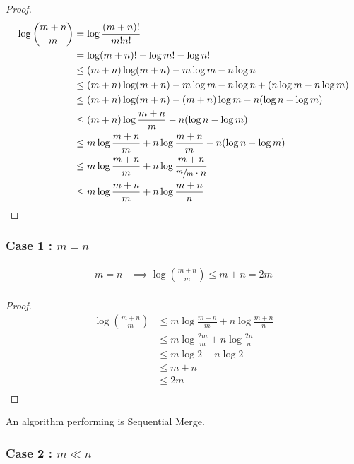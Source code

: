 \begin{proof}
\begin{align*}
\log\binom{m+n}{m} &= \log\frac{(m+n)!}{m!n!}\\
&= \log(m+n)! - \log m! - \log n!\\
&\leq (m+n) \log(m+n) - m \log m - n \log n\\
&\leq (m+n) \log(m+n) - m \log m - n \log n + (n \log m - n \log m)\\
&\leq (m+n) \log(m+n) - (m+n) \log m - n (\log n - \log m)\\
&\leq (m+n) \log\frac{m+n}{m} - n (\log n - \log m)\\
&\leq m \log\frac{m+n}{m} + n \log\frac{m+n}{m} - n (\log n - \log m)\\
&\leq m \log\frac{m+n}{m} + n \log\frac{m+n}{\sfrac{m}{m} \cdot n}\\
&\leq m \log\frac{m+n}{m} + n \log\frac{m+n}{n}\\
\end{align*}
\end{proof}

\subsubsection{Case 1\texorpdfstring{ : $m = n$}{}}

\begin{lemma}
\begin{align*}
m = n &\implies \log\binom{m+n}{m} \leq m + n = 2m\\
\end{align*}
\end{lemma}

\begin{proof}
\begin{align*}
\log\binom{m+n}{m} &\leq m \log\frac{m+n}{m} + n \log\frac{m+n}{n}\\
&\leq m \log\frac{2m}{m} + n \log\frac{2n}{n}\\
&\leq m \log 2 + n \log 2\\
&\leq m + n\\
&\leq 2m\\
\end{align*}
\end{proof}

An algorithm performing  is Sequential Merge.

\subsubsection{Case 2\texorpdfstring{ : $m \ll n$}{}}

